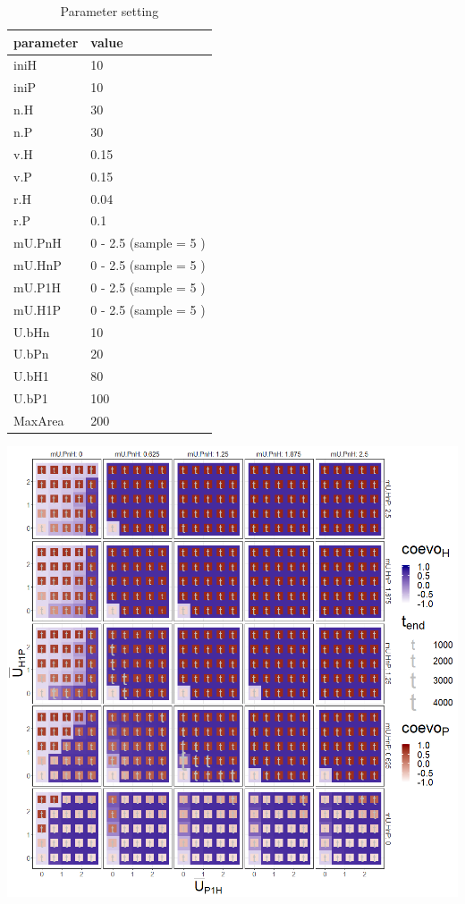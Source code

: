 \documentclass[]{book}
\begin{document}
\begin{table}[!h]

\caption{\label{tab:4mUHPmUPHtablepdf}Parameter setting}
\centering
\begin{tabular}{l|l}
\hline
parameter & value\\
\hline
iniH & 10\\
\hline
iniP & 10\\
\hline
n.H & 30\\
\hline
n.P & 30\\
\hline
v.H & 0.15\\
\hline
v.P & 0.15\\
\hline
r.H & 0.04\\
\hline
r.P & 0.1\\
\hline
mU.PnH & 0 - 2.5 (sample = 5 )\\
\hline
mU.HnP & 0 - 2.5 (sample = 5 )\\
\hline
mU.P1H & 0 - 2.5 (sample = 5 )\\
\hline
mU.H1P & 0 - 2.5 (sample = 5 )\\
\hline
U.bHn & 10\\
\hline
U.bPn & 20\\
\hline
U.bH1 & 80\\
\hline
U.bP1 & 100\\
\hline
MaxArea & 200\\
\hline
\end{tabular}
\end{table}

\newpage

\includegraphics[width=1\linewidth]{plots/4_fourPar-mU.HP-mU.PH_plot}
\end{document}
